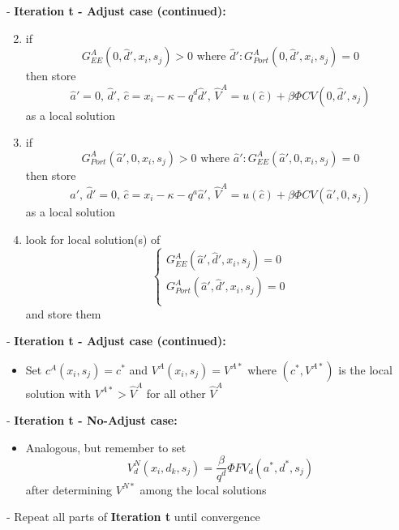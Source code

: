\documentclass{beamer}
\begin{document}
\begin{frame}
  \footnotesize
  - \textbf{Iteration t - Adjust case (continued):}
  \begin{itemize}
    \begin{enumerate}
      \setcounter{enumi}{1}
      \footnotesize
      \item if
      \begin{equation*}
        G^A_{EE}(0,\hat{d}',x_i,s_j) > 0\text{ where }\hat{d}': G^A_{Port}(0,\hat{d}',x_i,s_j)=0
      \end{equation*}
      then store
      \begin{equation*}
        \hat{a}'=0\text{, }\hat{d}'\text{, }\hat{c} = x_i-\kappa-q^d\hat{d}'\text{, }\hat{V}^A = u(\hat{c}) + \beta \Phi CV(0,\hat{d}',s_j)
      \end{equation*}
      as a local solution
      \item if
      \begin{equation*}
        G^A_{Port}(\hat{a}',0,x_i,s_j)>0\text{ where }\hat{a}': G^A_{EE}(\hat{a}',0,x_i,s_j) = 0
      \end{equation*}
      then store
      \begin{equation*}
        \hat{a}'\text{, }\hat{d}'=0\text{, }\hat{c} = x_i-\kappa-q^a\hat{a}'\text{, }\hat{V}^A = u(\hat{c}) + \beta \Phi CV(\hat{a}',0,s_j)
      \end{equation*}
      as a local solution
      \item look for local solution(s) of
      \begin{equation*}
        \begin{cases}
          G^A_{EE}(\hat{a}',\hat{d}',x_i,s_j) = 0 \\
          G^A_{Port}(\hat{a}',\hat{d}',x_i,s_j) = 0 \\
        \end{cases}
      \end{equation*}
      and store them
    \end{enumerate}
  \end{itemize}
\end{frame}

\begin{frame}
  \footnotesize
  - \textbf{Iteration t - Adjust case (continued):}
  \begin{itemize}
    \item Set $c^A(x_i,s_j)=c^*$ and $V^A(x_i,s_j)=V^{A*}$ where $(c^*, V^{A*})$ is the local solution with $V^{A*}>\hat{V}^A$ for all other $\hat{V}^A$
  \end{itemize}
  - \textbf{Iteration t - No-Adjust case:}
  \begin{itemize}
    \item Analogous, but remember to set
    \begin{equation*}
      V_d^N(x_i, d_k, s_j) = \frac{\beta}{q^d}\Phi FV_d(a^*,d^*,s_j)
    \end{equation*}
    after determining $V^{N*}$ among the local solutions
  \end{itemize}
  - Repeat all parts of \textbf{Iteration t} until convergence
\end{frame}
\end{document}
